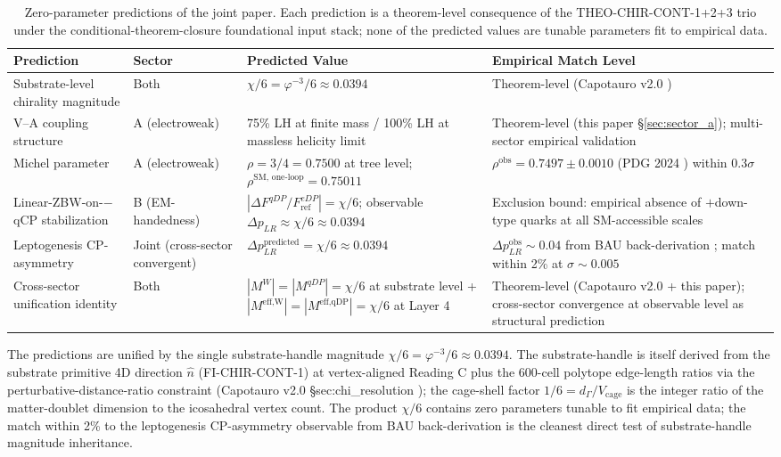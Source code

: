 \documentclass[11pt,letterpaper]{article}
\newcommand{\DeltapLR}{\Delta p_{LR}}
\newcommand{\DeltaFqDP}{\Delta F^{qDP}}
\newcommand{\FeDPref}{F^{eDP}_{\text{ref}}}
\newcommand{\Vcage}{V_{\text{cage}}}
\newcommand{\dGamma}{d_\Gamma}
\begin{document}
\begin{table}[h!]
\caption{Zero-parameter predictions of the joint paper. Each prediction is a theorem-level consequence of the THEO-CHIR-CONT-1+2+3 trio under the conditional-theorem-closure foundational input stack; none of the predicted values are tunable parameters fit to empirical data.}
\label{tab:zero_parameter_predictions}
\begin{center}
\small
\begin{tabular}{p{3.5cm}p{1.8cm}p{3.5cm}p{3.5cm}}
\toprule
\textbf{Prediction} & \textbf{Sector} & \textbf{Predicted Value} & \textbf{Empirical Match Level} \\
\midrule
Substrate-level chirality magnitude & Both & $\chi/6 = \varphi^{-3}/6 \approx 0.0394$ & Theorem-level (Capotauro v2.0 \cite{Capotauro}) \\
V--A coupling structure & A (electroweak) & 75\% LH at finite mass / 100\% LH at massless helicity limit & Theorem-level (this paper §\ref{sec:sector_a}); multi-sector empirical validation \cite{Goldhaber1958, LEPElectroweak, ATLASTopSpin, CMSTopSpin} \\
Michel parameter & A (electroweak) & $\rho = 3/4 = 0.7500$ at tree level; $\rho^{\text{SM, one-loop}} = 0.75011$ & $\rho^{\text{obs}} = 0.7497 \pm 0.0010$ (PDG 2024 \cite{PDG2024}) within $0.3\sigma$ \\
Linear-ZBW-on-$-$qCP stabilization & B (EM-handedness) & $|\DeltaFqDP/\FeDPref| = \chi/6$; observable $\DeltapLR \approx \chi/6 \approx 0.0394$ & Exclusion bound: empirical absence of $+$down-type quarks at all SM-accessible scales \\
Leptogenesis CP-asymmetry & Joint (cross-sector convergent) & $\DeltapLR^{\text{predicted}} = \chi/6 \approx 0.0394$ & $\DeltapLR^{\text{obs}} \sim 0.04$ from BAU back-derivation \cite{DavidsonNardiNir}; match within 2\% at $\sigma \sim 0.005$ \\
Cross-sector unification identity & Both & $|M^W| = |M^{qDP}| = \chi/6$ at substrate level + $|M^{\text{eff,W}}| = |M^{\text{eff,qDP}}| = \chi/6$ at Layer 4 & Theorem-level (Capotauro v2.0 + this paper); cross-sector convergence at observable level as structural prediction \\
\bottomrule
\end{tabular}
\end{center}
\end{table}

The predictions are unified by the single substrate-handle magnitude $\chi/6 = \varphi^{-3}/6 \approx 0.0394$. The substrate-handle is itself derived from the substrate primitive 4D direction $\hat{n}$ (FI-CHIR-CONT-1) at vertex-aligned Reading C plus the 600-cell polytope edge-length ratios via the perturbative-distance-ratio constraint (Capotauro v2.0 §sec:chi\_resolution \cite{Capotauro}); the cage-shell factor $1/6 = \dGamma/\Vcage$ is the integer ratio of the matter-doublet dimension to the icosahedral vertex count. The product $\chi/6$ contains zero parameters tunable to fit empirical data; the match within 2\% to the leptogenesis CP-asymmetry observable from BAU back-derivation is the cleanest direct test of substrate-handle magnitude inheritance.
\end{document}
